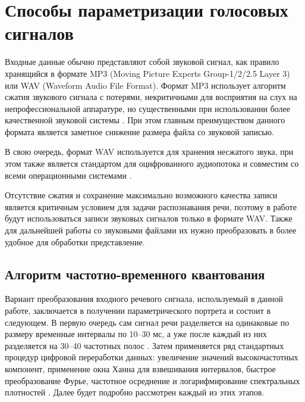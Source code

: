 
\section{Способы параметризации голосовых сигналов} \label{sect1_2}

Входные данные обычно представляют собой звуковой сигнал, как правило хранящийся в формате MP3 (Moving Picture Experts Group-1/2/2.5 Layer 3) или WAV (Waveform Audio File Format).
Формат MP3 использует алгоритм сжатия звукового сигнала с потерями, некритичными для восприятия на слух на непрофессиональной аппаратуре, но существенными при использовании более качественной звуковой системы \cite{mp3}.
При этом главным преимуществом данного формата является заметное снижение размера файла со звуковой записью.

В свою очередь, формат WAV используется для хранения несжатого звука, при этом также является стандартом для оцифрованного аудиопотока и совместим со всеми операционными системами \cite{wav}.

Отсутствие сжатия и сохранение максимально возможного качества записи является критичным условием для задачи распознавания речи, поэтому в работе будут использоваться записи звуковых сигналов только в формате WAV.
Также для дальнейшей работы со звуковыми файлами их нужно преобразовать в более удобное для обработки представление.


\subsection{Алгоритм частотно-временного квантования} \label{sect1_2_1}

Вариант преобразования входного речевого сигнала, используемый в данной работе, заключается в получении параметрического портрета и состоит в следующем.
В первую очередь сам сигнал речи разделяется на одинаковые по размеру временные интервалы по 10--30 мс, а уже после каждый из них разделяется на 30--40 частотных полос \cite{evdokimenkov2015use, kolokolov2015compare}.
Затем применяется ряд стандартных процедур цифровой переработки данных: увеличение значений высокочастотных компонент, применение окна Ханна для взвешивания интервалов, быстрое преобразование Фурье, частотное осреднение и логарифмирование спектральных плотностей \cite{kolokolov2006obrabotka, oppenheim1999discrete}.
Далее будет подробно рассмотрен каждый из этих этапов.

